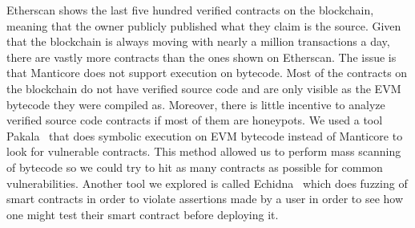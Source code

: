 Etherscan shows the last five hundred verified contracts on the blockchain, meaning that the owner publicly published what they claim is the source.
Given that the blockchain is always moving with nearly a million transactions a day, there are vastly more contracts than the ones shown on Etherscan.
The issue is that Manticore does not support execution on bytecode.
Most of the contracts on the blockchain do not have verified source code and are only visible as the EVM bytecode they were compiled as.
Moreover, there is little incentive to analyze verified source code contracts if most of them are honeypots.
We used a tool Pakala~\cite{pakala} that does symbolic execution on EVM bytecode instead of Manticore to look for vulnerable contracts.
This method allowed us to perform mass scanning of bytecode so we could try to hit as many contracts as possible for common vulnerabilities.
Another tool we explored is called Echidna~\cite{echidna} which does fuzzing of smart contracts in order to violate assertions made by a user in order to see how one might test their smart contract before deploying it.





